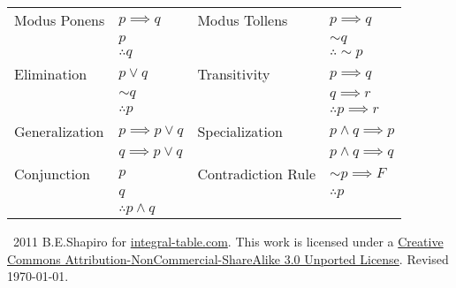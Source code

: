 \documentclass[10pt,letterpaper]{article}
\newcommand{\AND}{\wedge}
\newcommand{\OR}{\vee}
\begin{document}
\begin{doublespace}
\begin{center}
\begin{tabular}{|ll|ll|}
\hline
Modus Ponens & $p\implies q$  & Modus Tollens & $p\implies q$\\
             & $p$            &               & $\sim q$ \\
             & $\therefore q$ &               & $\therefore \sim p$ \\
             \hline
Elimination  & $p \OR q$      & Transitivity  & $p \implies q$ \\
             & $\sim q$       &               & $q \implies r$ \\
             & $\therefore p$ &               & $\therefore p \implies r$ \\
             \hline
Generalization & $p \implies p\OR q$ & Specialization & $p \AND q \implies p$ \\
               & $q \implies p\OR q$ &                & $p \AND q \implies q$ \\

\hline
Conjunction   &  $p$                          & Contradiction Rule & $\sim p \implies F$ \\
              &  $q$                          &                    & $\therefore p $\\
              &  $\therefore p \AND q$        & &\\
              \hline

\end{tabular}

\end{center}
\end{doublespace}

\vspace{1.5cm}
\begin{small}
\noindent \textcopyleft\ 2011 B.E.Shapiro for \href{http://integral-table.com}{integral-table.com}. This work is licensed under a \href{http://creativecommons.org/licenses/by-nc-sa/3.0/}{Creative Commons Attribution-NonCommercial-ShareAlike 3.0 Unported License}. Revised \today.
\end{small}
\end{document}
